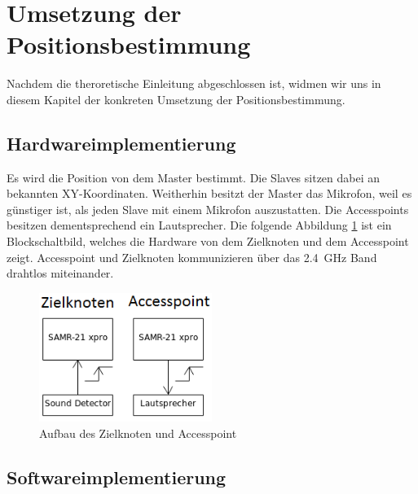 \newpage
\section{Umsetzung der Positionsbestimmung}

Nachdem die theroretische Einleitung abgeschlossen ist, widmen wir uns in diesem Kapitel der konkreten Umsetzung der Positionsbestimmung.

\subsection{Hardwareimplementierung}
Es wird die Position von dem Master bestimmt. Die Slaves sitzen dabei an bekannten XY-Koordinaten. Weitherhin besitzt der Master das \microphone \platz Mikrofon, weil es günstiger ist, als jeden Slave mit einem  Mikrofon auszustatten. Die Accesspoints besitzen dementsprechend ein Lautsprecher. Die folgende Abbildung \ref{img:blockschaltbild} ist ein Blockschaltbild, welches die Hardware von dem Zielknoten und dem Accesspoint zeigt. Accesspoint und Zielknoten kommunizieren über das \SI{2,4}{GHz} Band drahtlos miteinander.

\begin{figure}[H]
        \centering
        \includegraphics[width=0.5\textwidth]{images/blockschaltbild.png}
        \caption{Aufbau des Zielknoten und Accesspoint}
        \label{img:blockschaltbild}
\end{figure}

\subsection{Softwareimplementierung}

